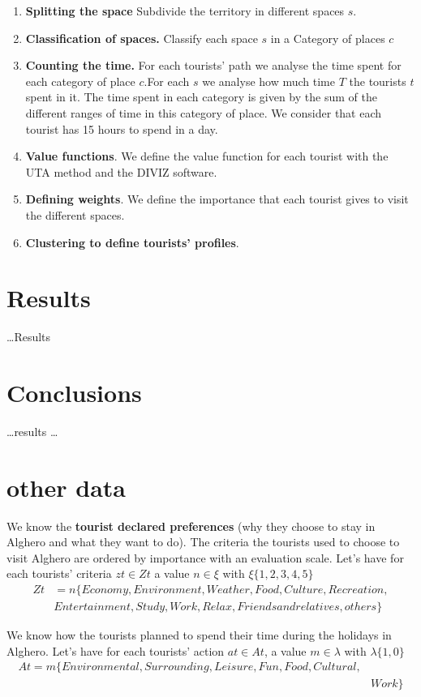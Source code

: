 \documentclass[a4paper]{article}
\begin{document}
\begin{enumerate}
\item \textbf{Splitting the space} Subdivide the territory in different spaces $s$.
\item \textbf{Classification of spaces.} Classify each space $s$ in a Category of places $c$
\item \textbf{Counting the time.} For each tourists' path we analyse the time spent for each category of place $c$.For each $s$ we analyse how much time $T$ the tourists $t$ spent in it. The time spent in each category is given by the  sum of the different ranges of time in this category of place. We consider that each tourist has 15 hours to spend in a day.
\item \textbf{Value functions}. We define the value function for each tourist with the UTA method and the DIVIZ software.
\item \textbf{Defining weights}. We define the importance that each tourist gives to visit the different spaces.
\item \textbf{Clustering to define tourists' profiles}.

\end{enumerate}


\section{Results}
\dots Results

\section{Conclusions}
\dots results \dots


\section{other data}
We know the \textbf{tourist declared preferences} (why they choose to stay in Alghero and what they want to do). The criteria the tourists used to choose to visit Alghero are ordered by importance with an evaluation scale. Let's have for each tourists' criteria $zt \in Zt$ a value $n \in \xi$ with $\xi\{1,2,3,4,5\}$
\begin{equation}
\begin{split}
Zt&=n\{Economy,Environment,Weather,Food,Culture,Recreation,\\
&Entertainment,Study,Work,Relax,Friends and relatives,others\}
\end{split}
\end{equation}


We know how the tourists planned to spend their time during the holidays in Alghero.  Let's have for each tourists' action $at\in At$, a value $m \in \lambda$ with $\lambda\{1,0\}$
\begin{equation}
\begin{split}
At=m\{Environmental,Surrounding,Leisure,Fun,Food,Cultural,\\
& Work\}
\end{split}
\end{equation}

\end{document}
